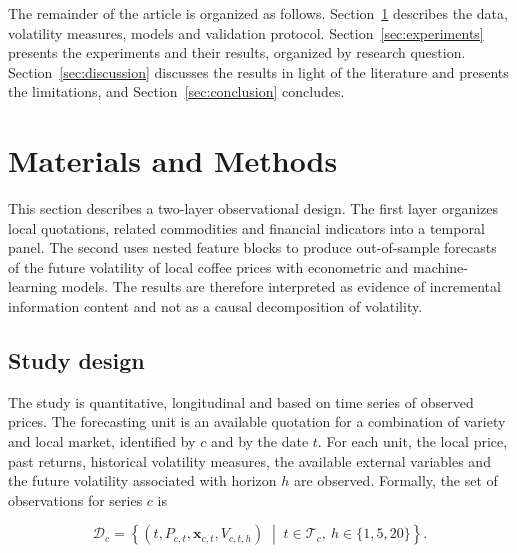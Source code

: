 \documentclass[a4paper,fleqn]{cas-sc}
\begin{document}
The remainder of the article is organized as follows. Section~\ref{sec:materials_methods} describes the data, volatility measures, models and validation protocol. Section~\ref{sec:experiments} presents the experiments and their results, organized by research question. Section~\ref{sec:discussion} discusses the results in light of the literature and presents the limitations, and Section~\ref{sec:conclusion} concludes.

\section{Materials and Methods}
\label{sec:materials_methods}

This section describes a two-layer observational design. The first layer organizes local quotations, related commodities and financial indicators into a temporal panel. The second uses nested feature blocks to produce out-of-sample forecasts of the future volatility of local coffee prices with econometric and machine-learning models. The results are therefore interpreted as evidence of incremental information content and not as a causal decomposition of volatility.

\subsection{Study design}
\label{subsec:study_design}

The study is quantitative, longitudinal and based on time series of observed prices. The forecasting unit is an available quotation for a combination of variety and local market, identified by \(c\) and by the date \(t\). For each unit, the local price, past returns, historical volatility measures, the available external variables and the future volatility associated with horizon \(h\) are observed. Formally, the set of observations for series \(c\) is

\begin{equation}
\mathcal{D}_{c}=\left\{\left(t,P_{c,t},\mathbf{x}_{c,t},V_{c,t,h}\right)\;\middle|\;t\in\mathcal{T}_{c},\ h\in\{1,5,20\}\right\}.
\label{eq:data_unit}
\end{equation}
\end{document}
